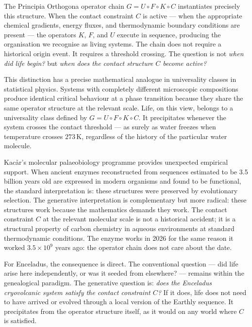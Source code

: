 \documentclass[12pt]{article}
\numberwithin{equation}{section}
\theoremstyle{remark}
\begin{document}
The Principia Orthogona operator chain $G = U\circ F\circ K\circ C$ instantiates
precisely this structure. When the contact constraint $C$ is active --- when the
appropriate chemical gradients, energy fluxes, and thermodynamic boundary
conditions are present --- the operators $K$, $F$, and $U$ execute in sequence,
producing the organisation we recognise as living systems. The chain does not
require a historical origin event. It requires a threshold crossing. The question
is not \emph{when did life begin?} but \emph{when does the contact structure $C$
become active?}

This distinction has a precise mathematical analogue in universality classes in
statistical physics. Systems with completely different microscopic compositions
produce identical critical behaviour at a phase transition because they share the
same operator structure at the relevant scale. Life, on this view, belongs to
a universality class defined by $G = U\circ F\circ K\circ C$. It precipitates
whenever the system crosses the contact threshold --- as surely as water freezes
when temperature crosses $273\,\mathrm{K}$, regardless of the history of the
particular water molecule.

Kac\r{a}r's molecular palaeobiology programme provides unexpected empirical support.
When ancient enzymes reconstructed from sequences estimated to be 3.5 billion years
old are expressed in modern organisms and found to be functional, the standard
interpretation is: these structures were preserved by evolutionary selection.
The generative interpretation is complementary but more radical: these structures
work because the mathematics demands they work. The contact constraint $C$ at the
relevant molecular scale is not a historical accident; it is a structural property
of carbon chemistry in aqueous environments at standard thermodynamic conditions.
The enzyme works in 2026 for the same reason it worked $3.5\times 10^9$ years ago:
the operator chain does not care about the date.

For Enceladus, the consequence is direct. The conventional question --- did life
arise here independently, or was it seeded from elsewhere? --- remains within the
genealogical paradigm. The generative question is: \emph{does the Enceladus
cryovolcanic system satisfy the contact constraint $C$?} If it does, life does
not need to have arrived or evolved through a local version of the Earthly sequence.
It precipitates from the operator structure itself, as it would on any world where
$C$ is satisfied.
\end{document}
